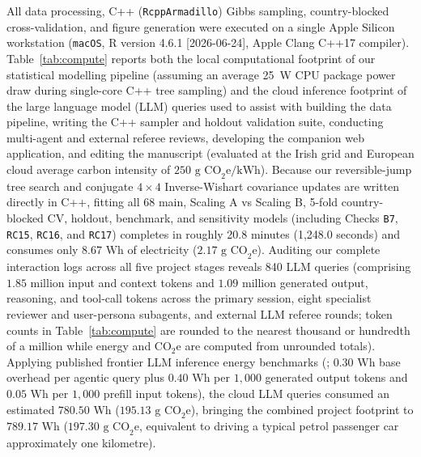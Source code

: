 \documentclass[11pt,a4paper]{article}
\begin{document}
All data processing, C++ (\texttt{RcppArmadillo}) Gibbs sampling, country-blocked cross-validation, and figure generation were executed on a single Apple Silicon workstation (\texttt{macOS}, R version 4.6.1 [2026-06-24], Apple Clang C++17 compiler). Table~\ref{tab:compute} reports both the local computational footprint of our statistical modelling pipeline (assuming an average 25~W CPU package power draw during single-core C++ tree sampling) and the cloud inference footprint of the large language model (LLM) queries used to assist with building the data pipeline, writing the C++ sampler and holdout validation suite, conducting multi-agent and external referee reviews, developing the companion web application, and editing the manuscript (evaluated at the Irish grid and European cloud average carbon intensity of $250\text{ g CO}_2\text{e/kWh}$). Because our reversible-jump tree search and conjugate $4 \times 4$ Inverse-Wishart covariance updates are written directly in C++, fitting all 68 main, Scaling A vs Scaling B, 5-fold country-blocked CV, holdout, benchmark, and sensitivity models (including Checks \texttt{B7}, \texttt{RC15}, \texttt{RC16}, and \texttt{RC17}) completes in roughly 20.8 minutes (1,248.0 seconds) and consumes only $8.67\text{ Wh}$ of electricity ($2.17\text{ g CO}_2\text{e}$). Auditing our complete interaction logs across all five project stages reveals 840 LLM queries (comprising $1.85\text{ million}$ input and context tokens and $1.09\text{ million}$ generated output, reasoning, and tool-call tokens across the primary session, eight specialist reviewer and user-persona subagents, and external LLM referee rounds; token counts in Table~\ref{tab:compute} are rounded to the nearest thousand or hundredth of a million while energy and $\text{CO}_2\text{e}$ are computed from unrounded totals). Applying published frontier LLM inference energy benchmarks (\citealt{luccioni2024power}; $0.30\text{ Wh}$ base overhead per agentic query plus $0.40\text{ Wh}$ per $1,000$ generated output tokens and $0.05\text{ Wh}$ per $1,000$ prefill input tokens), the cloud LLM queries consumed an estimated $780.50\text{ Wh}$ ($195.13\text{ g CO}_2\text{e}$), bringing the combined project footprint to $789.17\text{ Wh}$ ($197.30\text{ g CO}_2\text{e}$, equivalent to driving a typical petrol passenger car approximately one kilometre).
\end{document}
